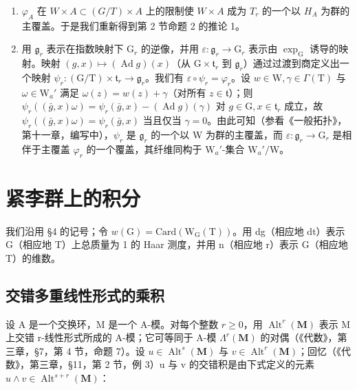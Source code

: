 \begin{enumerate}
\def\labelenumi{\arabic{enumi})}
\setcounter{enumi}{1}
\item
  \(\varphi_{A}\) 在 \(W \times A \subset (G/T) \times A\) 上的限制使 \(W \times A\) 成为 \(T_{r}\) 的一个以 \(H_{A}\) 为群的主覆盖。于是我们重新得到第 2 节命题 2 的推论 1。
\item
  用 \(\mathfrak{g}_r\) 表示在指数映射下 \(\mathrm{G}_r\) 的逆像，并用 \(\varepsilon : \mathfrak{g}_r \to \mathrm{G}_r\) 表示由 \(\exp_{\mathrm{G}}\) 诱导的映射。映射 \((g, x) \mapsto (\operatorname{Ad} g)(x)\)（从 \(\mathrm{G} \times \mathfrak{t}_r\) 到 \(\mathfrak{g}_r\)）通过过渡到商定义出一个映射 \(\psi_r : (\mathrm{G} / \mathrm{T}) \times \mathfrak{t}_r \to \mathfrak{g}_r\)。我们有 \(\varepsilon \circ \psi_r = \varphi_r\)。设 \(w \in \mathrm{W}, \gamma \in \Gamma(\mathrm{T})\) 与 \(\omega \in \mathrm{W}_a'\) 满足 \(\omega(z) = w(z) + \gamma\)（对所有 \(z \in \mathfrak{t}\)）；则 \(\psi_r((\bar{g}, x)\omega) = \psi_r(\bar{g}, x) - (\operatorname{Ad} g)(\gamma)\) 对 \(g \in \mathrm{G}, x \in \mathfrak{t}_r\) 成立，故 \(\psi_r((\bar{g}, x)\omega) = \psi_r(\bar{g}, x)\) 当且仅当 \(\gamma = 0\)。由此可知（参看《一般拓扑》，第十一章，编写中），\(\psi_r\) 是 \(\mathfrak{g}_r\) 的一个以 W 为群的主覆盖，而 \(\varepsilon : \mathfrak{g}_r \to \mathrm{G}_r\) 是相伴于主覆盖 \(\varphi_r\) 的一个覆盖，其纤维同构于 \(\mathrm{W}_a'\)-集合 \(\mathrm{W}_a'/\mathrm{W}\)。
\end{enumerate}

\section{紧李群上的积分}

我们沿用 §4 的记号；令 \(w(\mathrm{G}) = \mathrm{Card}(\mathrm{W}_{\mathrm{G}}(\mathrm{T}))\)。用 dg（相应地 dt）表示 G（相应地 T）上总质量为 1 的 Haar 测度，并用 n（相应地 r）表示 G（相应地 T）的维数。

\subsection{交错多重线性形式的乘积}

设 A 是一个交换环，M 是一个 A-模。对每个整数 \(r \geq 0\)，用 \(\operatorname{Alt}^{r}(\mathbf{M})\) 表示 M 上交错 r-线性形式所成的 A-模；它可等同于 A-模 \(\Lambda^{r}(\mathbf{M})\) 的对偶（《代数》，第三章，§7，第 4 节，命题 7）。设 \(u \in \operatorname{Alt}^{s}(\mathbf{M})\) 与 \(v \in \operatorname{Alt}^{r}(\mathbf{M})\)；回忆（《代数》，第三章，§11，第 2 节，例 3）u 与 v 的交错积是由下式定义的元素 \(u \wedge v \in \operatorname{Alt}^{s+r}(\mathbf{M})\)：

